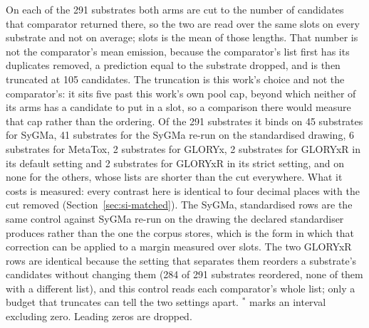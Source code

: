\begin{table}[t]
\begin{threeparttable}
\begin{tablenotes}[flushleft]
\item On each of the 291 substrates both arms are cut to the number of candidates that comparator returned there, so the two are read over the same slots on every substrate and not on average; slots is the mean of those lengths. That number is not the comparator's mean emission, because the comparator's list first has its duplicates removed, a prediction equal to the substrate dropped, and is then truncated at 105 candidates. The truncation is this work's choice and not the comparator's: it sits five past this work's own pool cap, beyond which neither of its arms has a candidate to put in a slot, so a comparison there would measure that cap rather than the ordering. Of the 291 substrates it binds on 45 substrates for SyGMa, 41 substrates for the SyGMa re-run on the standardised drawing, 6 substrates for MetaTox, 2 substrates for GLORYx, 2 substrates for GLORYxR in its default setting and 2 substrates for GLORYxR in its strict setting, and on none for the others, whose lists are shorter than the cut everywhere. What it costs is measured: every contrast here is identical to four decimal places with the cut removed (Section~\ref{sec:si-matched}). The SyGMa, standardised rows are the same control against SyGMa re-run on the drawing the declared standardiser produces rather than the one the corpus stores, which is the form in which that correction can be applied to a margin measured over slots. The two GLORYxR rows are identical because the setting that separates them reorders a substrate's candidates without changing them (284 of 291 substrates reordered, none of them with a different list), and this control reads each comparator's whole list; only a budget that truncates can tell the two settings apart. $^{*}$ marks an interval excluding zero. Leading zeros are dropped.
\end{tablenotes}
\end{threeparttable}
\end{table}
